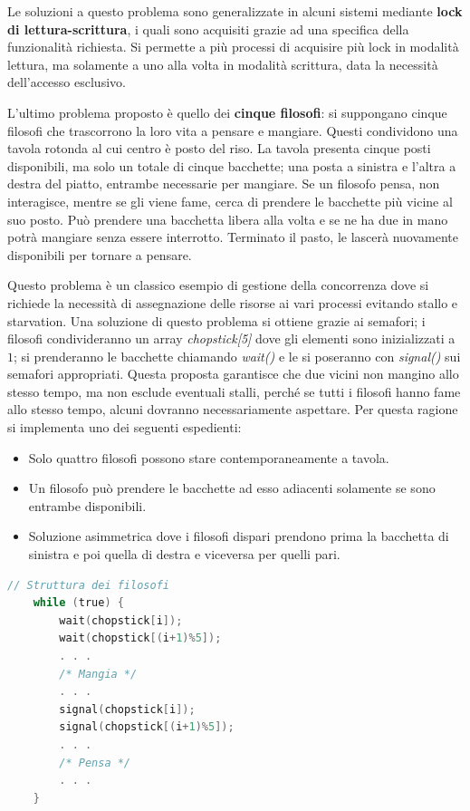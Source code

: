 \noindent Le soluzioni a questo problema sono generalizzate in alcuni sistemi mediante \textbf{lock di lettura-scrittura}, i quali sono acquisiti grazie
ad una specifica della funzionalità richiesta. Si permette a più processi di acquisire più lock in modalità lettura, ma solamente a uno alla volta in
modalità scrittura, data la necessità dell'accesso esclusivo.\par
L'ultimo problema proposto è quello dei \textbf{cinque filosofi}: si suppongano cinque filosofi che trascorrono la loro vita a pensare e mangiare.
Questi condividono una tavola rotonda al cui centro è posto del riso. La tavola presenta cinque posti disponibili, ma solo un totale di cinque 
bacchette; una posta a sinistra e l'altra a destra del piatto, entrambe necessarie per mangiare. Se un filosofo pensa, non interagisce, mentre se gli
viene fame, cerca di prendere le bacchette più vicine al suo posto. Può prendere una bacchetta libera alla volta e se ne ha due in mano potrà mangiare
senza essere interrotto. Terminato il pasto, le lascerà nuovamente disponibili per tornare a pensare.\par
Questo problema è un classico esempio di gestione della concorrenza dove si richiede la necessità di assegnazione delle risorse ai vari processi
evitando stallo e starvation. Una soluzione di questo problema si ottiene grazie ai semafori; i filosofi condivideranno un array \textit{chopstick[5]}
dove gli elementi sono inizializzati a $1$; si prenderanno le bacchette chiamando \textit{wait()} e le si poseranno con \textit{signal()} sui semafori
appropriati. Questa proposta garantisce che due vicini non mangino allo stesso tempo, ma non esclude eventuali stalli, perché se tutti i filosofi hanno
fame allo stesso tempo, alcuni dovranno necessariamente aspettare. Per questa ragione si implementa uno dei seguenti espedienti: \begin{itemize}
    \item Solo quattro filosofi possono stare contemporaneamente a tavola.
    \item Un filosofo può prendere le bacchette ad esso adiacenti solamente se sono entrambe disponibili.
    \item Soluzione asimmetrica dove i filosofi dispari prendono prima la bacchetta di sinistra e poi quella di destra e viceversa per quelli pari.
\end{itemize}

\begin{lstlisting}[language=C]
    // Struttura dei filosofi
    while (true) {
        wait(chopstick[i]);
        wait(chopstick[(i+1)%5]);
        . . .
        /* Mangia */
        . . .
        signal(chopstick[i]);
        signal(chopstick[(i+1)%5]);
        . . .
        /* Pensa */
        . . .
    }
\end{lstlisting}